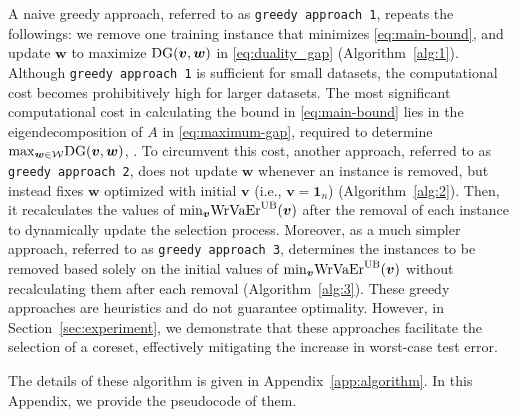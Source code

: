 A naive greedy approach, referred to as {\tt greedy approach 1}, repeats the followings: we remove one training instance that minimizes \eqref{eq:main-bound}, and update $\bm w$ to maximize ${\rm DG}(\bm v, \bm w)$ in \eqref{eq:duality_gap} (Algorithm~\ref{alg:1}).
%
Although {\tt greedy approach 1} is sufficient for small datasets, the computational cost becomes prohibitively high for larger datasets.
%
The most significant computational cost in calculating the bound in \eqref{eq:main-bound} lies in the eigendecomposition of $A$ in \eqref{eq:maximum-gap}, required to determine ${\rm max}_{\bm w \in {\mathcal W}}{\rm DG}(\bm v, \bm w)$, .
%
To circumvent this cost, another approach, referred to as {\tt greedy approach 2}, does not update $\bm w$ whenever an instance is removed, but instead fixes $\bm w$ optimized with initial $\bm v$ (i.e., $\bm v = \bm 1_n$) (Algorithm~\ref{alg:2}).
%
Then, it recalculates the values of ${\rm min}_{\bm v}\mathrm{WrVaEr}^{\mathrm{UB}}(\bm v)$ after the removal of each instance to dynamically update the selection process.
%
Moreover, as a much simpler approach, referred to as {\tt greedy approach 3}, determines the instances to be removed based solely on the initial values of ${\rm min}_{\bm v}\mathrm{WrVaEr}^{\mathrm{UB}}(\bm v)$ without recalculating them after each removal (Algorithm~\ref{alg:3}).
%
These greedy approaches are heuristics and do not guarantee optimality. However, in Section~\ref{sec:experiment}, we demonstrate that these approaches facilitate the selection of a coreset, effectively mitigating the increase in worst-case test error.

%
The details of these algorithm is given in {Appendix~\ref{app:algorithm}}. In this Appendix, we provide the pseudocode of them.
